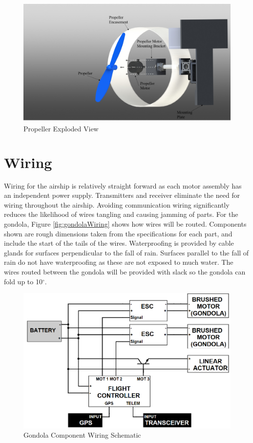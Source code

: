 \documentclass[../main.tex]{subfiles}
\begin{document}
\begin{figure}[H]
	\centering
	\includegraphics[width=.8\linewidth]{img/design/thruster/propAssembly.png}
	\caption{Propeller Exploded View}
	\label{fig:propAssembly}
\end{figure}

\section{Wiring}
Wiring for the airship is relatively straight forward as each motor assembly has an  independent power supply. Transmitters and receiver eliminate the need for wiring throughout the airship. Avoiding communication wiring significantly reduces the likelihood of wires tangling and causing jamming of parts. For the gondola, Figure \ref{fig:gondolaWiring} shows how wires will be routed. Components shown are rough dimensions taken from the specifications for each part, and include the start of the tails of the wires. Waterproofing is provided by cable glands for surfaces perpendicular to the fall of rain. Surfaces parallel to the fall of rain do not have waterproofing as these are not exposed to much water. The wires routed between the gondola will be provided with slack so the gondola can fold up to 10$^{\circ}$.
\\

\begin{figure}[H]
	\centering
	\includegraphics[width=.8\linewidth]{img/design/gondola/gondolaWiringSchematic.png}
	\caption{Gondola Component Wiring Schematic}
	\label{fig:gondolaWiringSchematic}
\end{figure}
\end{document}
